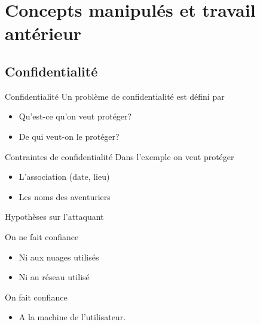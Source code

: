 \documentclass{beamer}
\begin{document}
\section{Concepts manipulés et travail antérieur}

\subsection{Confidentialité}
\begin{frame}{Confidentialité}
Un problème de confidentialité est défini par
\begin{itemize}
\item Qu'est-ce qu'on veut protéger?
\item De qui veut-on le protéger?
\end{itemize}
\end{frame}

\begin{frame}{Contraintes de confidentialité}
Dans l'exemple on veut protéger 
\begin{itemize}
\item L'association (date, lieu)
\item Les noms des aventuriers
\end{itemize}
\end{frame}

\begin{frame}{Hypothèses sur l'attaquant}
\begin{alertblock}{On ne fait confiance}
\begin{itemize}
\item Ni aux nuages utilisés
\item Ni au réseau utilisé
\end{itemize}
\end{alertblock}

\begin{exampleblock}{On fait confiance}
\begin{itemize}
\item A la machine de l'utilisateur.
\end{itemize}
\end{exampleblock}

\end{frame}
\end{document}
